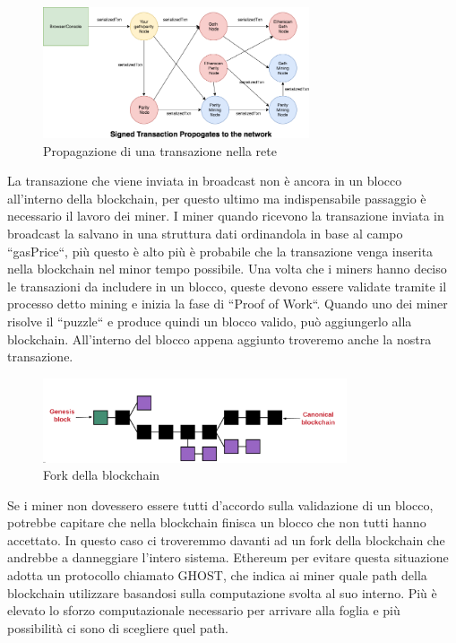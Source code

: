 \documentclass[12pt]{report}
\begin{document}
\begin{figure}[H]
    \centering\includegraphics[width=0.7\textwidth]{broadcast}
    \caption{Propagazione di una transazione nella rete}
\end{figure}


La transazione che viene inviata in broadcast non è ancora in un blocco all'interno della blockchain, per questo ultimo ma indispensabile passaggio è necessario il lavoro dei miner.
I miner quando ricevono la transazione inviata in broadcast la salvano in una struttura dati ordinandola in base al campo ``gasPrice``, più questo è alto più è probabile che la transazione venga inserita nella blockchain nel minor tempo possibile.
Una volta che i miners hanno deciso le transazioni da includere in un blocco, queste devono essere validate tramite il processo detto mining e inizia la fase di ``Proof of Work``. Quando uno dei miner risolve il ``puzzle`` e produce quindi un blocco valido, può aggiungerlo alla blockchain. 
All'interno del blocco appena aggiunto troveremo anche la nostra transazione.
\begin{figure}[H]
    \centering\includegraphics[width=0.8\textwidth]{Fork}
    \caption{Fork della blockchain}
\end{figure}

Se i miner non dovessero essere tutti d'accordo sulla validazione di un blocco, potrebbe capitare che nella blockchain finisca un blocco che non tutti hanno accettato. In questo caso ci troveremmo davanti ad un fork della blockchain che andrebbe a danneggiare l'intero sistema.
Ethereum per evitare questa situazione adotta un protocollo chiamato GHOST, che indica ai miner quale path della blockchain utilizzare basandosi sulla computazione svolta al suo interno. Più è elevato lo sforzo computazionale necessario per arrivare alla foglia e più possibilità ci sono di scegliere quel path.
\end{document}
